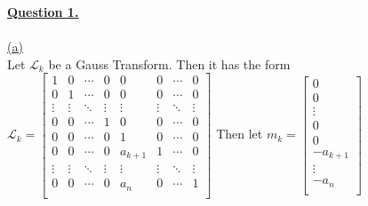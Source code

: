 \documentclass[12pt]{article}
\begin{document}
\noindent \hyperlink{toc}{\LARGE \underline{\textbf{Question 1.}}}\\\\
\noindent \hyperlink{toc}{\hypertarget{1.1}{(a)}}\\
Let $\mathcal{L}_k$ be a Gauss Transform. Then it has the form\\
$
    \mathcal{L}_k =
    \begin{bmatrix}
        1      & 0      & \cdots & 0      & 0       & 0      & \cdots & 0      \\
        0      & 1      & \cdots & 0      & 0       & 0      & \cdots & 0      \\
        \vdots & \vdots & \ddots & \vdots & \vdots  & \vdots & \ddots & \vdots \\
        0      & 0      & \cdots & 1      & 0       & 0      & \cdots & 0      \\
        0      & 0      & \cdots & 0      & 1       & 0      & \cdots & 0      \\
        0      & 0      & \cdots & 0      & a_{k+1} & 1      & \cdots & 0      \\
        \vdots & \vdots & \ddots & \vdots & \vdots  & \vdots & \ddots & \vdots \\
        0      & 0      & \cdots & 0      & a_{n}   & 0      & \cdots & 1      \\
    \end{bmatrix}
$ \hspace*{3cm}
Then let $m_k =
    \begin{bmatrix}
        0        \\
        0        \\
        \vdots   \\
        0        \\
        0        \\
        -a_{k+1} \\
        \vdots   \\
        -a_{n}   \\
    \end{bmatrix}$\\[1cm]
\end{document}
